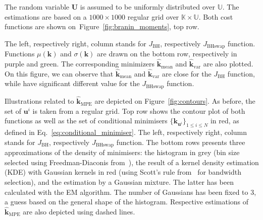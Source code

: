 \documentclass[preprint, 1p]{elsarticle}
\newcommand{\kmean}{{\mathbf{k}}_{\mathrm{mean}}}
\newcommand{\hatkmean}{\hat{\mathbf{k}}_{\mathrm{mean}}}
\newcommand{\kvar}{{\mathbf{k}}_{\mathrm{var}}}
\newcommand{\hatkvar}{\hat{\mathbf{k}}_{\mathrm{var}}}
\newcommand{\hatkmpe}{\hat{\mathbf{k}}_{\mathrm{MPE}}}
\newcommand{\Kspace}{\mathbb{K}}
\newcommand{\Uspace}{\mathbb{U}}
\begin{document}
The random variable $\mathbf{U}$ is assumed to be uniformly distributed over $\Uspace$.
The estimations are %
based on a $1000 \times 1000$ regular grid over $\Kspace\times\Uspace$. Both cost functions are shown on~Figure~\ref{fig:branin_moments}, top row.


 The left, respectively right, column stands for $J_{\mathrm{BH}}$, respectively $J_{\mathrm{BHswap}}$ function. Functions $\mu(\mathbf{k})$ and $\sigma(\mathbf{k})$ are drawn on the bottom row, respectively in purple and green. The corresponding minimizers $\hatkmean$ and $\hatkvar$ are also plotted.
On this figure, we can observe that $\hatkmean$ and $\hatkvar$ are close for the $J_{\mathrm{BH}}$ function, while have significant different value for the $J_{\mathrm{BHswap}}$ function.


Illustrations related to $\hatkmpe$ are depicted on Figure~\ref{fig:contours}. As before, the set of $\mathbf{u}^i$ is taken from a regular grid. Top row shows the contour plot of both functions as well as the set of conditional minimisers $\{\mathbf{k}_{\mathbf{u}^i}\}_{1\leq i \leq N}$ in red, as defined in Eq.~\eqref{eq:conditional_minimiser}.
The left, respectively right, column stands for $J_{\mathrm{BH}}$, respectively $J_{\mathrm{BHswap}}$ function. The bottom rows presents three approximations of the density of minimisers: the histogram in grey (bin size selected using Freedman-Diaconis from~\cite{freedman_histogram_1981}), the result of a kernel density estimation (KDE) with Gaussian kernels in red (using Scott's rule from~\cite{scott_optimal_1979} for bandwidth selection), and the estimation by a Gaussian mixture. The latter has been calculated with the EM algorithm. The number of Gaussians has been fixed to 3, a guess based on the general shape of the histogram. Respective estimations of $\hatkmpe$ are also depicted using dashed lines. 

\end{document}
